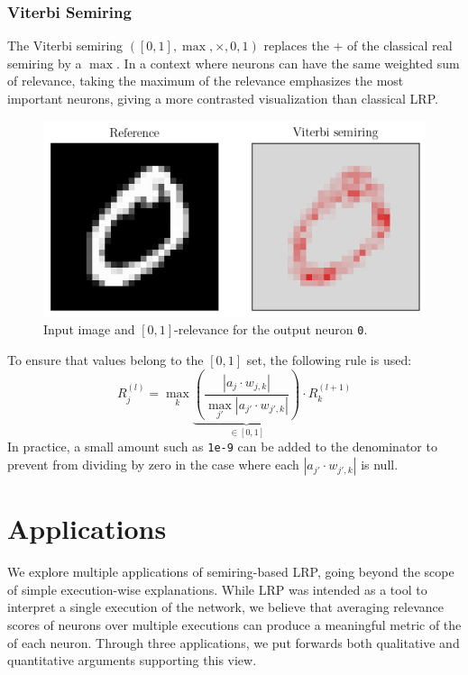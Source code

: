 \documentclass[twocolumn]{../cs-classes/cs-classes}
\newcommand*{\1}{\digitsbb{1}}
\newcommand*{\0}{\digitsbb{0}}
\begin{document}
\subsubsection{Viterbi Semiring}
The Viterbi semiring $([0, 1], \max, \times, 0, 1)$ replaces the $+$ of the classical real semiring by a $\max$. In a context where neurons can have the same weighted sum of relevance, taking the maximum of the relevance emphasizes the most important neurons, giving a more contrasted visualization than classical LRP. 
\begin{figure}[H]
    \centering
    \includegraphics[width=.9\linewidth]{viterbi.png}
    \caption{Input image and $[0, 1]$-relevance for the output neuron \texttt{0}.}
\end{figure}
To ensure that values belong to the $[0, 1]$ set, the following rule is used:
\begin{equation}
    R^{(l)}_j = \max_k \underbrace{\left(\frac{\left|a_j\cdot w_{j, k}\right|}{\max_{j'} \left|a_{j'}\cdot w_{j', k}\right|}\right)}_{\in[0, 1]} \cdot R^{(l+1)}_k
\end{equation}
In practice, a small amount such as \texttt{1e-9} can be added to the denominator to prevent from dividing by zero in the case where each $|a_{j'}\cdot w_{j',k}|$ is null.


\section{Applications}
We explore multiple applications of semiring-based LRP, going beyond the scope of simple execution-wise explanations. While LRP was intended as a tool to interpret a single execution of the network, we believe that averaging relevance scores of neurons over multiple executions can produce a meaningful metric of the  of each neuron. Through three applications, we put forwards both qualitative and quantitative arguments supporting this view.
\end{document}
